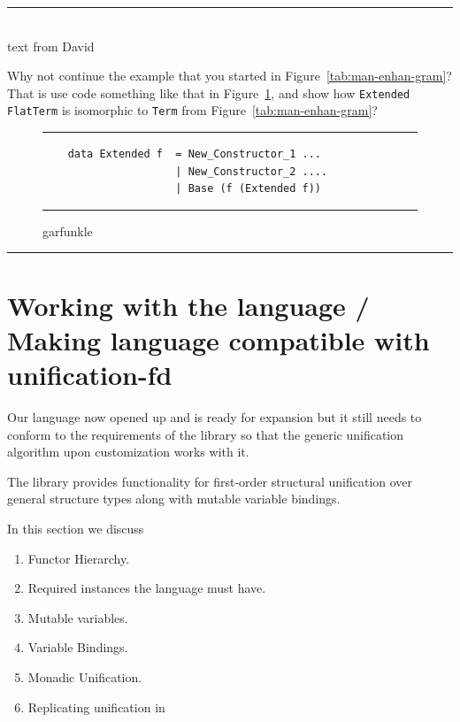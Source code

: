 \documentclass[thesis-solanki.tex]{subfiles}
\begin{document}
\begin{center}
  \textcolor{blue}{\rule{\0.95\textwidth}{0.2em}}\\[-1ex]
  text from David
\end{center}
Why not continue the example that you started in Figure~\ref{tab:man-enhan-gram}?
That is use code something like that in Figure~\ref{tab:garfunkle}, and show how
\Verb!Extended FlatTerm! is isomorphic to \Verb!Term! from Figure~\ref{tab:man-enhan-gram}?
\begin{figure}[h]
  \rule{0.98\textwidth}{0.3pt}
  \begin{verbatim}
    data Extended f  = New_Constructor_1 ...
                     | New_Constructor_2 ....
                     | Base (f (Extended f))
  \end{verbatim}
  \caption{garfunkle}
  \label{tab:garfunkle}
  \rule{0.98\textwidth}{0.3pt}
\end{figure}

\noindent\textcolor{blue}{\rule{\0.95\textwidth}{0.25pt}}

\section{Working with the language / Making language compatible with unification-fd}

Our language now opened up and is ready for expansion but it still needs to conform to the requirements of the \cite{unification-fd-lib}
library so that the generic unification algorithm upon customization works with it.

The library provides functionality for first-order structural unification over general structure types along with mutable variable
bindings.

In this section we discuss
\begin{enumerate}
\item Functor Hierarchy.

\item Required instances the language must have.

\item Mutable variables.

\item Variable Bindings.

\item Monadic Unification.

\item Replicating  unification in 
\end{enumerate}
\end{document}
